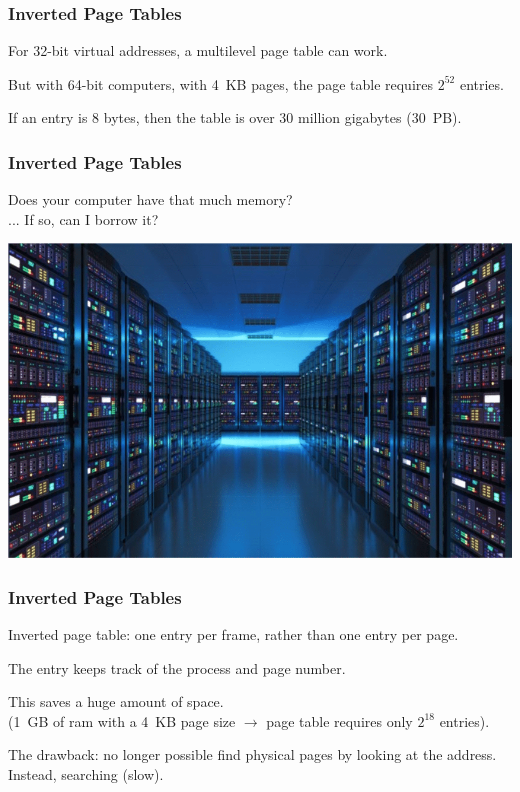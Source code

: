 \begin{frame}
\frametitle{Inverted Page Tables}

For 32-bit virtual addresses, a multilevel page table can work. 

But with 64-bit computers, with 4~KB pages, the page table requires $2^{52}$ entries.

If an entry is 8 bytes, then the table is over 30 million gigabytes (30~PB).

\end{frame}

\begin{frame}
\frametitle{Inverted Page Tables}

Does your computer have that much memory?\\
\quad ... If so, can I borrow it?

\begin{center}
	\includegraphics[width=\textwidth]{images/datacentre.png}
\end{center}



\end{frame}

\begin{frame}
\frametitle{Inverted Page Tables}

Inverted page table: one entry per frame, rather than one entry per page.

The entry keeps track of the process and page number. 

This saves a huge amount of space.\\
\quad (1~GB of ram with a 4~KB page size $\rightarrow$ page table requires only $2^{18}$ entries).

The drawback: no longer possible find physical pages by looking at the address.\\
\quad Instead, searching (slow).

\end{frame}


